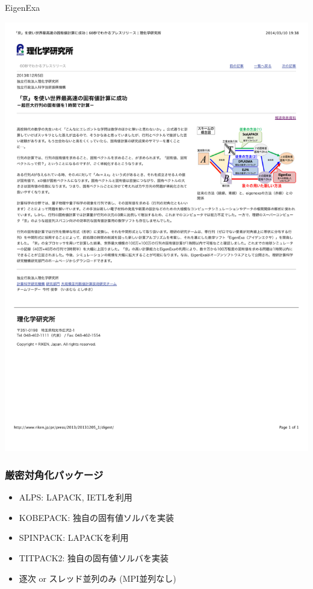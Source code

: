 \begin{frame}{EigenExa}
  \begin{center}
    \includegraphics[height=0.8\textheight]{figure/eigenexa.pdf}
  \end{center}
\end{frame}

\begin{frame}
  \frametitle{厳密対角化パッケージ}
  \begin{itemize}
  \item ALPS: LAPACK, IETLを利用
  \item KOBEPACK: 独自の固有値ソルバを実装
  \item SPINPACK: LAPACKを利用
  \item TITPACK2: 独自の固有値ソルバを実装
  \item 逐次 or スレッド並列のみ (MPI並列なし)
  \end{itemize}
\end{frame}

